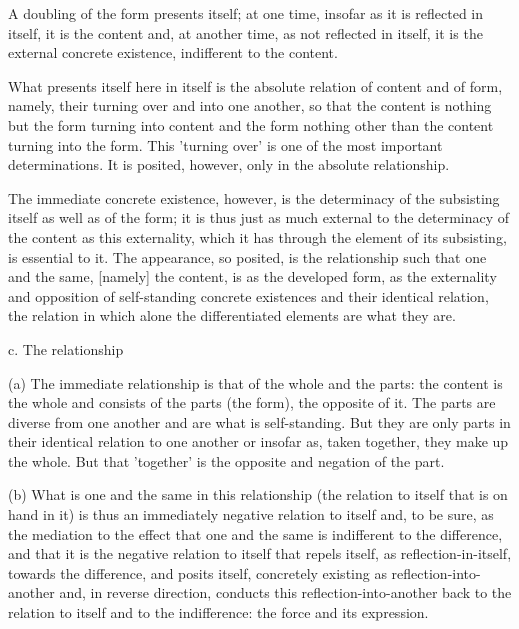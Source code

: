     A doubling of the form presents itself;
    at one time,
    insofar as it is reflected in itself,
    it is the content and,
    at another time,
    as not reflected in itself,
    it is the external concrete existence,
    indifferent to the content.

    What presents itself here in itself is
    the absolute relation of content and of form, namely,
    their turning over and into one another,
    so that the content is nothing but the form turning into content
    and the form nothing other than the content turning into the form.
    This 'turning over' is one of the most important determinations.
    It is posited, however, only in the absolute relationship.

The immediate concrete existence, however, is
the determinacy of the subsisting itself as well as of the form;
it is thus just as much external to the determinacy of the content
as this externality, which it has through the element of its subsisting,
is essential to it.
The appearance, so posited, is the relationship
such that one and the same, [namely] the content, is
as the developed form, as the externality and opposition of
self-standing concrete existences and their identical relation,
the relation in which alone the differentiated elements are what they are.

c. The relationship

(a) The immediate relationship is that of the whole and the parts:
the content is the whole and consists of the parts (the form),
the opposite of it.
The parts are diverse from one another
and are what is self-standing.
But they are only parts in
their identical relation to one another
or insofar as, taken together, they make up the whole.
But that 'together' is the opposite and negation of the part.

(b) What is one and the same in this relationship
(the relation to itself that is on hand in it)
is thus an immediately negative relation to itself and,
to be sure, as the mediation to the effect that one and the same
is indifferent to the difference, and that
it is the negative relation to itself that repels itself,
as reflection-in-itself, towards the difference, and posits itself,
concretely existing as reflection-into-another and, in reverse direction,
conducts this reflection-into-another back to
the relation to itself and to the indifference:
the force and its expression.

